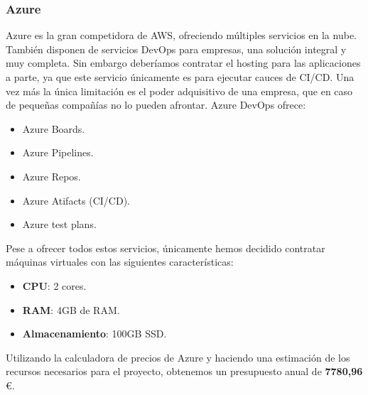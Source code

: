 		\subsubsection{Azure}
			\begin{text}
				Azure es la gran competidora de AWS, ofreciendo múltiples servicios en la nube. También disponen de servicios DevOps \cite{AzureDev63:online} para empresas, una solución integral y muy completa. Sin embargo deberíamos contratar el hosting para las aplicaciones a parte, ya que este servicio únicamente es para ejecutar cauces de CI/CD. Una vez más la única limitación es el poder adquisitivo de una empresa, que en caso de pequeñas compañías no lo pueden afrontar. Azure DevOps ofrece:
				\begin{itemize}
					\item Azure Boards.
					\item Azure Pipelines.
					\item Azure Repos.
					\item Azure Atifacts (CI/CD).
					\item Azure test plans.
				\end{itemize}
			
			Pese a ofrecer todos estos servicios, únicamente hemos decidido contratar máquinas virtuales con las siguientes características:
			
			\begin{itemize}
				\item \textbf{CPU}: 2 cores.
				\item \textbf{RAM}: 4GB de RAM.
				\item \textbf{Almacenamiento}: 100GB SSD.
			\end{itemize}
		
				Utilizando la calculadora de precios de Azure \cite{azurecalculadora:online} y haciendo una estimación de los recursos necesarios para el proyecto, obtenemos un presupuesto anual de \textbf{7780,96} \space \euro.
			\end{text}
	
		
